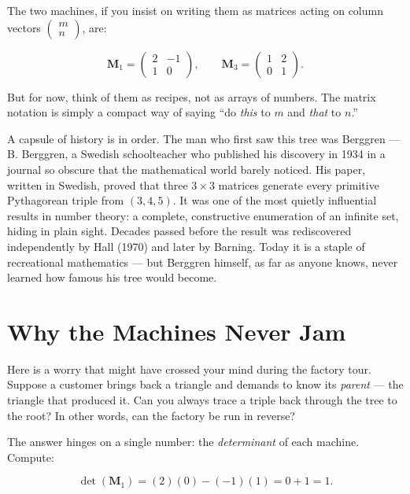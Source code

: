 The two machines, if you insist on writing them as matrices acting on column vectors \(\begin{pmatrix} m \\ n \end{pmatrix}\), are:

\[
\mathbf{M}_1 = \begin{pmatrix} 2 & -1 \\ 1 & 0 \end{pmatrix}, \qquad
\mathbf{M}_3 = \begin{pmatrix} 1 & 2 \\ 0 & 1 \end{pmatrix}.
\]

But for now, think of them as recipes, not as arrays of numbers. The matrix notation is simply a compact way of saying ``do \emph{this} to \(m\) and \emph{that} to \(n\).''

A capsule of history is in order. The man who first saw this tree was Berggren --- B. Berggren, a Swedish schoolteacher who published his discovery in 1934 in a journal so obscure that the mathematical world barely noticed. His paper, written in Swedish, proved that three \(3 \times 3\) matrices generate every primitive Pythagorean triple from \((3, 4, 5)\). It was one of the most quietly influential results in number theory: a complete, constructive enumeration of an infinite set, hiding in plain sight. Decades passed before the result was rediscovered independently by Hall (1970) and later by Barning. Today it is a staple of recreational mathematics --- but Berggren himself, as far as anyone knows, never learned how famous his tree would become.



\section{Why the Machines Never Jam}\label{ch2-why-the-machines-never-jam}

Here is a worry that might have crossed your mind during the factory tour. Suppose a customer brings back a triangle and demands to know its \emph{parent} --- the triangle that produced it. Can you always trace a triple back through the tree to the root? In other words, can the factory be run in reverse?

The answer hinges on a single number: the \emph{determinant} of each machine. Compute:

\[
\det(\mathbf{M}_1) = (2)(0) - (-1)(1) = 0 + 1 = 1.
\]

